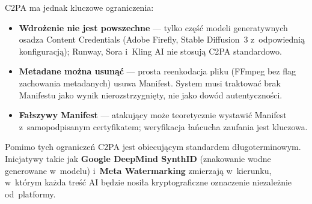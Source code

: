 C2PA ma jednak kluczowe ograniczenia:
\begin{itemize}
  \item \textbf{Wdro\.{z}enie nie jest powszechne} ---
        tylko cz\k{e}\'{s}\'{c} modeli generatywnych osadza
        Content Credentials (Adobe Firefly, Stable Diffusion~3
        z~odpowiedni\k{a} konfiguracj\k{a}); Runway, Sora
        i~Kling AI nie stosuj\k{a} C2PA standardowo.
  \item \textbf{Metadane mo\.{z}na usun\k{a}\'{c}} ---
        prosta reenkodacja pliku (FFmpeg bez flag zachowania
        metadanych) usuwa Manifest. System musi traktowa\'{c}
        brak Manifestu jako wynik nierozstrzygni\k{e}ty,
        nie jako dow\'{o}d autentyczno\'{s}ci.
  \item \textbf{Fa\l{}szywy Manifest} ---
        atakuj\k{a}cy mo\.{z}e teoretycznie wystawi\'{c} Manifest
        z~samopodpisanym certyfikatem;
        weryfikacja \l{}a\'{n}cucha zaufania jest kluczowa.
\end{itemize}

Pomimo tych ogranicze\'{n} C2PA jest obiecuj\k{a}cym
standardem d\l{}ugoterminowym.
Inicjatywy takie jak \textbf{Google DeepMind SynthID}
(znakowanie wodne generowane w~modelu)
i~\textbf{Meta Watermarking} zmierzaj\k{a} w~kierunku,
w~kt\'{o}rym ka\.{z}da tre\'{s}\'{c} AI b\k{e}dzie nosi\l{}a
kryptograficzne oznaczenie niezale\.{z}nie od~platformy.

